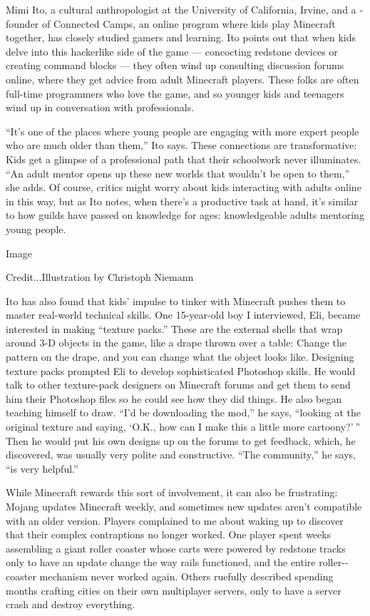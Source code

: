 Mimi Ito, a cultural anthropologist at the University of California,
Irvine, and a ­founder of Connected Camps, an online program where kids
play Minecraft together, has closely studied gamers and learning. Ito
points out that when kids delve into this hackerlike side of the game
--- concocting redstone devices or creating command blocks --- they
often wind up consulting discussion forums online, where they get advice
from adult Minecraft players. These folks are often full-time
programmers who love the game, and so younger kids and teenagers wind up
in conversation with professionals.

``It's one of the places where young people are engaging with more
expert people who are much older than them,'' Ito says. These
connections are transformative: Kids get a glimpse of a professional
path that their schoolwork never illuminates. ``An adult mentor opens up
these new worlds that wouldn't be open to them,'' she adds. Of course,
critics might worry about kids interacting with adults online in this
way, but as Ito notes, when there's a productive task at hand, it's
similar to how guilds have passed on knowledge for ages: knowledgeable
adults mentoring young people.

Image

Credit...Illustration by Christoph Niemann

Ito has also found that kids' impulse to tinker with Minecraft pushes
them to master real-world technical skills. One 15-year-old boy I
interviewed, Eli, became interested in making ``texture packs.'' These
are the external shells that wrap around 3-D objects in the game, like a
drape thrown over a table: Change the pattern on the drape, and you can
change what the object looks like. Designing texture packs prompted Eli
to develop sophisticated Photoshop skills. He would talk to other
texture-­pack designers on Minecraft forums and get them to send him
their Photoshop files so he could see how they did things. He also began
teaching himself to draw. ``I'd be downloading the mod,'' he says,
``looking at the original texture and saying, `O.K., how can I make this
a little more cartoony?' '' Then he would put his own designs up on the
forums to get feedback, which, he discovered, was usually very polite
and constructive. ``The community,'' he says, ``is very helpful.''

While Minecraft rewards this sort of involvement, it can also be
frustrating: Mojang updates Minecraft weekly, and sometimes new updates
aren't compatible with an older version. Players complained to me about
waking up to discover that their complex contraptions no longer worked.
One player spent weeks assembling a giant roller coaster whose carts
were powered by redstone tracks only to have an update change the way
rails functioned, and the entire roller-­coaster mechanism never worked
again. Others ruefully described spending months crafting cities on
their own multiplayer servers, only to have a server crash and destroy
everything.

